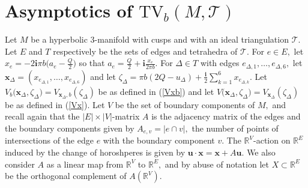 \documentclass[11pt]{article}
\theoremstyle{remark}
\theoremstyle{remark}
\numberwithin{equation}{section}
\begin{document}



\section{Asymptotics of $\mathrm{TV}_b(M,\mathcal T)$}

Let $M$ be a hyperbolic $3$-manifold with cusps and  with an ideal triangulation $\mathcal T.$ Let $E$ and $T$ respectively be the sets of edges and tetrahedra of $\mathcal T.$ For $e\in E,$ let $x_e=-2\mathbf i\pi b\big( a_e-\frac{Q}{2}\big)$ so that $a_e=\frac{Q}{2}+\mathbf i \frac{x_e}{2\pi b}.$ For $\Delta\in T$ with edges $e_{\Delta,1},\dots,e_{\Delta,6},$ let $\boldsymbol x_\Delta=(x_{e_{\Delta,1}},\dots,x_{e_{\Delta,6}})$ and let $\zeta_\Delta=\pi b (2Q-u_\Delta)+\frac{\mathbf i}{2}\sum_{k=1}^6x_{e_{\Delta,k}}.$ Let $V_b\big(\boldsymbol x_\Delta,\zeta_\Delta\big)=V_{\boldsymbol x_\Delta,b}(\zeta_\Delta)$
be as defined in (\ref{Vxb}) and let $V\big(\boldsymbol x_\Delta,\zeta_\Delta\big)=V_{\boldsymbol x_\Delta}(\zeta_\Delta)$
be as defined in (\ref{Vx}). Let $V$ be the set of boundary components of $M,$ and recall again that the $|E|\times |V|$-matrix $A$ is the adjacency matrix of the edges and the boundary components given by $A_{e,v}=|e\cap v|,$ the number of points of intersections of the edge $e$ with the boundary component $v.$  The $\mathbb R^V$-action on $\mathbb R^E$ induced by the change of horoshperes is given by $\boldsymbol u\cdot \boldsymbol x = \boldsymbol x + A \boldsymbol u.$ We also consider $A$ as a linear map from $\mathbb R^V$ to $\mathbb R^E,$ and by abuse of notation let $X\subset \mathbb R^E$ be the orthogonal complement of $A(\mathbb R^V).$
\end{document}
